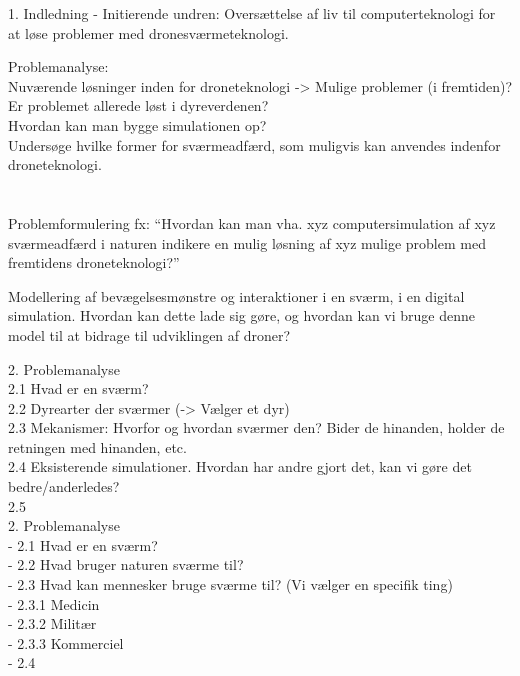 
1. Indledning
 - Initierende undren: Oversættelse af liv til computerteknologi for at løse problemer med dronesværmeteknologi.

Problemanalyse: \\
Nuværende løsninger inden for droneteknologi -> Mulige problemer (i fremtiden)?\\
Er problemet allerede løst i dyreverdenen?\\
Hvordan kan man bygge simulationen op?\\
Undersøge hvilke former for sværmeadfærd, som muligvis kan anvendes indenfor droneteknologi. \\
\\\\
Problemformulering fx: “Hvordan kan man vha. xyz computersimulation af xyz sværmeadfærd i naturen indikere en mulig løsning af xyz mulige problem med fremtidens droneteknologi?”

Modellering af bevægelsesmønstre og interaktioner i en sværm, i en digital simulation. Hvordan kan dette lade sig gøre, og hvordan kan vi bruge denne model til at bidrage til udviklingen af droner?

2. Problemanalyse\\
    2.1 Hvad er en sværm?\\
    2.2 Dyrearter der sværmer (-> Vælger et dyr)\\
    2.3 Mekanismer: Hvorfor og hvordan sværmer den? Bider de hinanden, holder de retningen med hinanden, etc. \\
    2.4 Eksisterende simulationer. Hvordan har andre gjort det, kan vi gøre det bedre/anderledes?\\
    2.5\\



2. Problemanalyse\\
 - 2.1 Hvad er en sværm?\\
 - 2.2 Hvad bruger naturen sværme til?\\
 - 2.3 Hvad kan mennesker bruge sværme til? (Vi vælger en specifik ting)\\
  - 2.3.1 Medicin\\
  - 2.3.2 Militær\\
  - 2.3.3 Kommerciel\\
 - 2.4 
 
